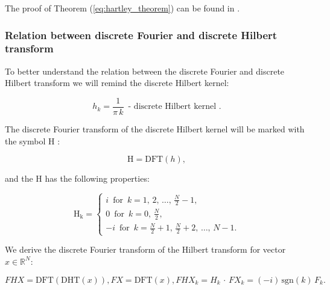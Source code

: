 \documentclass[12pt,twoside,a4paper]{article}
\numberwithin{equation}{subsection}
\numberwithin{figure}{subsection}
\begin{document}
The proof of Theorem (\ref{eq:hartley_theorem}) can be found in \cite{chang_computation}. 

\subsubsection*{Relation between discrete Fourier and discrete Hilbert transform}

To better understand the relation between the discrete Fourier and discrete Hilbert transform we will remind the discrete Hilbert kernel:

\begin{equation}   \label{eq:hdfttps_smallh}
	h_k = \frac {1}{\pi \, k} \, \mbox{ - discrete Hilbert kernel } .  
\end{equation}

The discrete Fourier transform of the discrete Hilbert kernel will be marked with the symbol $\mathrm{H}$ :

\begin{equation}   \label{eq:hdfttps_bigh}
    \mathrm{H} = \mathrm{DFT}(h), 
\end{equation}

and the $\mathrm{H}$ has the following properties:

\begin{subequations} \label{eq:hartley_defh}
  \begin{equation}   \label{eq:hdefh_fhalf}
    \mathrm{H_k} =  
    \begin{cases}
    	i  \, \mbox{ for } \, k = 1, \, 2, \, \ldots, \, \frac {N}{2} - 1 , \\
    	0  \, \mbox{ for } \, k = 0, \, \frac {N}{2} , \\
    	-i \, \mbox{ for } \, k = \frac {N}{2} + 1, \, \frac {N}{2} + 2, \, \ldots, \, N - 1 .
    \end{cases}
  \end{equation} 
\end{subequations}

We derive the discrete Fourier transform of the Hilbert transform for vector $x \in \mathbb{R} ^ N$:

\begin{subequations} \label{eq:hartley_dfttheorem}
	\begin{equation}
		FHX = \mathrm{DFT} \left(\mathrm{DHT} (x) \right) ,
	\end{equation}
	\begin{equation}
		FX = \mathrm{DFT} (x) ,
	\end{equation}
	\begin{equation} 
	    FHX_k = H_k \, \cdot \, FX_k = ( - i) \, \mathrm{\text{sgn}}(k) \, F_k .
	\end{equation}
\end{subequations}
\end{document}
